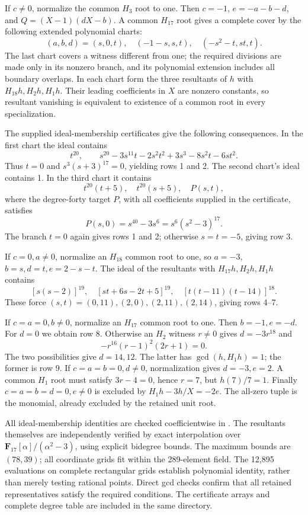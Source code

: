 \documentclass[
  british,
  10pt,
  a4paper,
]{article}
\begin{document}
If \(c\ne0\), normalize the common \(H_3\) root to one. Then \(c=-1\),
\(e=-a-b-d\), and \(Q=(X-1)(dX-b)\). A common \(H_{17}\) root gives a
complete cover by the following extended polynomial charts: \[
 (a,b,d)=(s,0,t),\quad(-1-s,s,t),\quad(-s^2-t,st,t).
\] The last chart covers a witness different from one; the required
divisions are made only in its nonzero branch, and its polynomial
extension includes all boundary overlaps. In each chart form the three
resultants of \(h\) with \(H_{18}h,H_2h,H_1h\). Their leading
coefficients in \(X\) are nonzero constants, so resultant vanishing is
equivalent to existence of a common root in every specialization.

The supplied ideal-membership certificates give the following
consequences. In the first chart the ideal contains \[
 t^{20},\qquad s^{20}-3s^{11}t-2s^2t^2+3s^3-8s^2t-6st^2.
\] Thus \(t=0\) and \(s^3(s+3)^{17}=0\), yielding rows 1 and 2. The
second chart's ideal contains 1. In the third chart it contains \[
 t^{20}(t+5),\quad t^{20}(s+5),\quad P(s,t),
\] where the degree-forty target \(P\), with all coefficients supplied
in the certificate, satisfies \[
 P(s,0)=s^{40}-3s^6=s^6(s^2-3)^{17}.
\] The branch \(t=0\) again gives rows 1 and 2; otherwise \(s=t=-5\),
giving row 3.

If \(c=0,a\ne0\), normalize an \(H_{18}\) common root to one, so
\(a=-3\), \(b=s,d=t,e=2-s-t\). The ideal of the resultants with
\(H_{17}h,H_2h,H_1h\) contains \[
 [s(s-2)]^{19},\quad [st+6s-2t+5]^{19},\quad
 [t(t-11)(t-14)]^{18}.
\] These force \((s,t)=(0,11),(2,0),(2,11),(2,14)\), giving rows 4--7.

If \(c=a=0,b\ne0\), normalize an \(H_{17}\) common root to one. Then
\(b=-1,e=-d\). For \(d=0\) we obtain row 8. Otherwise an \(H_2\) witness
\(r\ne0\) gives \(d=-3r^{18}\) and \[
-r^{16}(r-1)^2(2r+1)=0.
\] The two possibilities give \(d=14,12\). The latter has
\(\gcd(h,H_1h)=1\); the former is row 9. If \(c=a=b=0,d\ne0\),
normalization gives \(d=-3,e=2\). A common \(H_1\) root must satisfy
\(3r-4=0\), hence \(r=7\), but \(h(7)/7=1\). Finally \(c=a=b=d=0,e\ne0\)
is excluded by \(H_1h-3h/X=-2e\). The all-zero tuple is the monomial,
already excluded by the retained unit root.

All ideal-membership identities are checked coefficientwise in
.
The resultants themselves are independently verified by exact
interpolation over \(\mathbf F_{17}[\alpha]/(\alpha^2-3)\), using
explicit bidegree bounds. The maximum bounds are \((78,39)\); all
coordinate grids fit within the 289-element field. The 12,895
evaluations on complete rectangular grids establish polynomial identity,
rather than merely testing rational points. Direct gcd checks confirm
that all retained representatives satisfy the required conditions. The
certificate arrays and complete degree table are included in the same
directory.
\end{document}
